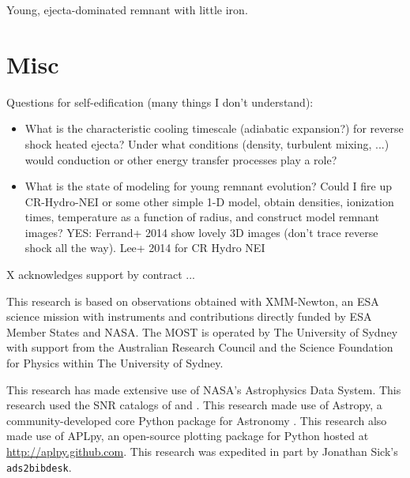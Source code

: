\documentclass[preprint2,tighten,trackchanges]{aastex6}
\begin{document}
Young, ejecta-dominated remnant with little iron.

\section{Misc}

Questions for self-edification (many things I don't understand):
\begin{itemize}
    \item What is the characteristic cooling timescale (adiabatic expansion?)
        for reverse shock heated ejecta?
        Under what conditions (density, turbulent mixing, ...)
        would conduction or other energy transfer processes play a role?
    \item What is the state of modeling for young remnant evolution?
        Could I fire up CR-Hydro-NEI or some other simple 1-D model,
        obtain densities, ionization times, temperature as a function of
        radius, and construct model remnant images?
        YES: Ferrand+ 2014 show lovely 3D images (don't trace reverse shock all
        the way).
        Lee+ 2014 for CR Hydro NEI
\end{itemize}

\acknowledgments

X acknowledges support by contract ...

This research is based on observations obtained with XMM-Newton, an ESA science
mission with instruments and contributions directly funded by ESA Member States
and NASA.
The MOST is operated by The University of Sydney with support from the
Australian Research Council and the Science Foundation for Physics within The
University of Sydney.

This research has made extensive use of NASA's Astrophysics Data System.
This research used the SNR catalogs of \citet{ferrand2012} and
\citet{green2014}.
This research made use of Astropy, a community-developed core Python package
for Astronomy \citep{astropy2013}.
This research also made use of APLpy, an open-source plotting package for
Python hosted at \url{http://aplpy.github.com}.
This research was expedited in part by Jonathan Sick's \texttt{ads2bibdesk}.





\end{document}
